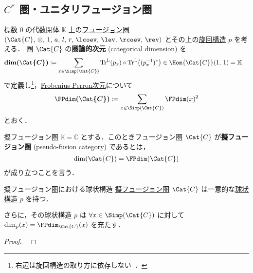 \documentclass[TQFT_main]{subfiles}
\begin{document}
\subsection{$C^*$ 圏・ユニタリフュージョン圏}

標数 $0$ の代数閉体 $\mathbb{K}$ 上の\hyperref[def:tensorfusion-cat]{フュージョン圏} $(\Cat{C},\, \otimes,\, 1,\, a,\, l,\, r,\, \lcoev,\, \lev,\, \rcoev,\, \rev)$ とその上の\hyperref[def:pivotal]{旋回構造} $p$ を考える．
圏 $\Cat{C}$ の\textbf{圏論的次元} (categorical dimension) を
\begin{align}
    \label{def:categorialTr}
    \bm{\dim (\Cat{C})} &\coloneqq \sum_{x \in \Simp(\Cat{C})} \Tr^{\mathrm{L}} (p_x) \circ \Tr^{\mathrm{L}} \bigl( (p_x^{-1})^* \bigr) \in \Hom{\Cat{C}}(1,\, 1) = \mathbb{K}
\end{align}
で定義し\footnote{右辺は旋回構造の取り方に依存しない~\cite[p.179]{etingof2015tensor}．}，\hyperref[def:FPdim]{Frobenius-Perron次元}について
\begin{align}
    \bm{\FPdim (\Cat{C})} \coloneqq \sum_{x \in \Simp(\Cat{C})} \FPdim (x)^2
\end{align}
とおく．

\begin{mydef}[label=def:pseudo-unitary]{擬フュージョン圏}
    $\mathbb{K} = \mathbb{C}$ とする．このときフュージョン圏 $\Cat{C}$ が\textbf{擬フュージョン圏} (pseudo-fusion category) であるとは，
    \begin{align}
        \dim (\Cat{C}) = \FPdim (\Cat{C})
    \end{align}
    が成り立つことを言う．
\end{mydef}

\begin{myprop}[label=prop:pseudo-unitary]{擬フュージョン圏における球状構造}
    \hyperref[def:pseudo-unitary]{擬フュージョン圏} $\Cat{C}$ は一意的な\hyperref[def:spherical]{球状構造} $p$ を持つ．
    
    さらに，その球状構造 $p$ は $\forall x \in \Simp(\Cat{C})$ に対して $\dim_p (x) = \FPdim_{\Cat{C}} (x)$ を充たす．
\end{myprop}

\begin{proof}
    ~\cite[PROPOSITION 9.5.1., p.284]{etingof2015tensor}
\end{proof}
\end{document}
